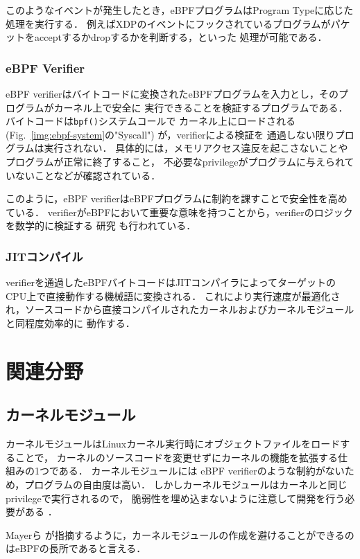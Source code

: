 \documentclass[platex,a4j,10pt,twoside,twocolumn,dvipdfmx]{jsarticle}
\newcommand{\Fref}[1]{Fig.~\ref{#1}}
\begin{document}
    このようなイベントが発生したとき，eBPFプログラムはProgram Typeに応じた処理を実行する．
    例えばXDPのイベントにフックされているプログラムがパケットをacceptするかdropするかを判断する，といった
    処理が可能である．
    
    \subsubsection{eBPF Verifier}
    eBPF verifierはバイトコードに変換されたeBPFプログラムを入力とし，そのプログラムがカーネル上で安全に
    実行できることを検証するプログラムである．バイトコードは\texttt{bpf()}システムコールで
    カーネル上にロードされる (\Fref{img:ebpf-system}の"Syscall") が，verifierによる検証を
    通過しない限りプログラムは実行されない．
    具体的には，メモリアクセス違反を起こさないことやプログラムが正常に終了すること，
    不必要なprivilegeがプログラムに与えられていないことなどが確認されている．
    
    このように，eBPF verifierはeBPFプログラムに制約を課すことで安全性を高めている．
    verifierがeBPFにおいて重要な意味を持つことから，verifierのロジックを数学的に検証する
    研究 \cite{vishwanathan2023verifying}も行われている．
    
    \subsubsection{JITコンパイル}
    verifierを通過したeBPFバイトコードはJITコンパイラによってターゲットのCPU上で直接動作する機械語に変換される．
    これにより実行速度が最適化され，ソースコードから直接コンパイルされたカーネルおよびカーネルモジュールと同程度効率的に
    動作する．
    
\section{関連分野}
  \subsection{カーネルモジュール}
  カーネルモジュールはLinuxカーネル実行時にオブジェクトファイルをロードすることで，
  カーネルのソースコードを変更せずにカーネルの機能を拡張する仕組みの1つである．
  カーネルモジュールには eBPF verifierのような制約がないため，プログラムの自由度は高い．
  しかしカーネルモジュールはカーネルと同じprivilegeで実行されるので，
  脆弱性を埋め込まないように注意して開発を行う必要がある \cite{chen2011linux}．

  Mayerら \cite{mayer2021performance}が指摘するように，カーネルモジュールの作成を避けることができるのはeBPFの長所であると言える．
  
\end{document}
